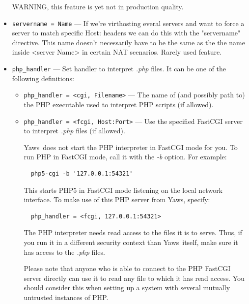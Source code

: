 \documentclass[11pt,oneside,english]{book}
\newcommand{\Yaws}            %
        {{\sc Yaws}}
\begin{document}
\begin{itemize}
              WARNING, this feature is yet not in production quality.

\item       \verb+servername = Name+ ---
              If we're virthosting everal servers and want to force a server to
              match specific Host: headers we can do this with the "servername"
              directive. This name doesn't necessarily have to be the same as
              the the name inside <server Name> in certain NAT scenarios. Rarely
              used feature.

\item       \verb+php_handler+ ---
              Set handler to interpret \textit{.php} files. It can be
              one of the following definitions:

              \begin{itemize}
              \item \verb+php_handler = <cgi, Filename>+ --- The name
                of (and possibly path to) the PHP executable used to
                interpret PHP scripts (if allowed).
              \item \verb+php_handler = <fcgi, Host:Port>+ --- Use the
                specified FastCGI server to interpret \textit{.php}
                files (if allowed).

                \Yaws\ does not start the PHP interpreter in FastCGI
                mode for you. To run PHP in FastCGI mode, call it with
                the \textit{-b} option. For example:
\begin{verbatim}
  php5-cgi -b '127.0.0.1:54321'
\end{verbatim}
                This starts PHP5 in FastCGI mode listening on the local
                network interface. To make use of this PHP server from
                \Yaws{}, specify:
\begin{verbatim}
  php_handler = <fcgi, 127.0.0.1:54321>
\end{verbatim}
                The PHP interpreter needs read access to the files it
                is to serve. Thus, if you run it in a different
                security context than \Yaws\ itself, make sure it has
                access to the \textit{.php} files.

                Please note that anyone who is able to connect to the PHP
                FastCGI server directly can use it to read any file to
                which it has read access. You should consider this
                when setting up a system with several mutually
                untrusted instances of PHP.


\end{itemize}
\end{itemize}
\end{document}
